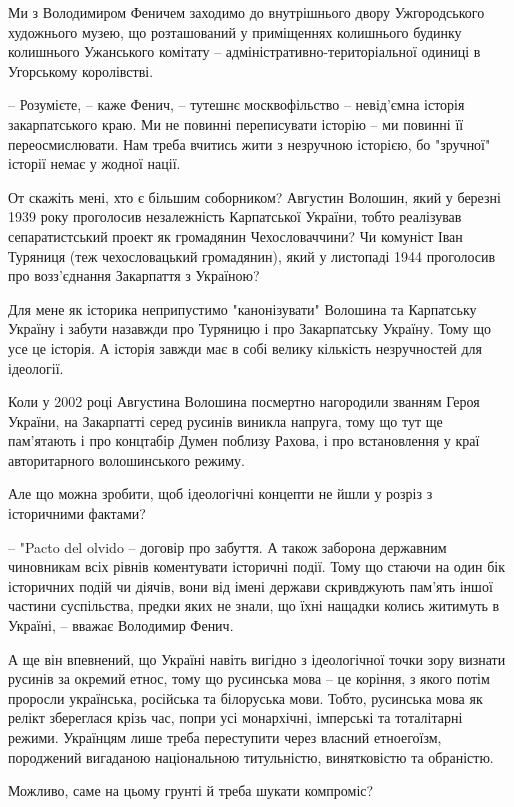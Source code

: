 Ми з Володимиром Феничем заходимо до внутрішнього двору Ужгородського
художнього музею, що розташований у приміщеннях колишнього будинку колишнього
Ужанського комітату – адміністративно-територіальної одиниці в Угорському
королівстві.

– Розумієте, – каже Фенич, – тутешнє москвофільство – невід’ємна історія
закарпатського краю. Ми не повинні переписувати історію – ми повинні її
переосмислювати. Нам треба вчитись жити з незручною історією, бо "зручної"
історії немає у жодної нації.

От скажіть мені, хто є більшим соборником? Августин Волошин, який у березні
1939 року проголосив незалежність Карпатської України, тобто реалізував
сепаратистський проект як громадянин Чехословаччини? Чи комуніст Іван Туряниця
(теж чехословацький громадянин), який у листопаді 1944 проголосив про
возз’єднання Закарпаття з Україною?

Для мене як історика неприпустимо "канонізувати" Волошина та Карпатську Україну
і забути назавжди про Туряницю і про Закарпатську Україну. Тому що усе це
історія. А історія завжди має в собі велику кількість незручностей для
ідеології.

Коли у 2002 році Августина Волошина посмертно нагородили званням Героя України,
на Закарпатті серед русинів виникла напруга, тому що тут ще пам’ятають і про
концтабір Думен поблизу Рахова, і про встановлення у краї авторитарного
волошинського режиму.

Але що можна зробити, щоб ідеологічні концепти не йшли у розріз з історичними
фактами?

– "Pacto del olvido – договір про забуття. А також заборона державним
чиновникам всіх рівнів коментувати історичні події. Тому що стаючи на один бік
історичних подій чи діячів, вони від імені держави скривджують пам'ять іншої
частини суспільства, предки яких не знали, що їхні нащадки колись житимуть в
Україні, – вважає Володимир Фенич.

А ще він впевнений, що Україні навіть вигідно з ідеологічної точки зору визнати
русинів за окремий етнос, тому що русинська мова – це коріння, з якого потім
проросли українська, російська та білоруська мови. Тобто, русинська мова як
релікт збереглася крізь час, попри усі монархічні, імперські та тоталітарні
режими. Українцям лише треба переступити через власний етноегоїзм, породжений
вигаданою національною титульністю, винятковістю та обраністю.

Можливо, саме на цьому грунті й треба шукати компроміс?

